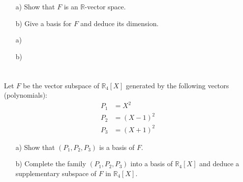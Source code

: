 \documentclass[12pt]{article}
\begin{document}
\begin{enumerate}
    \item[a)] Show that $F$ is an $\mathbb{R}$-vector space.
    \item[b)] Give a basis for $F$ and deduce its dimension.
\end{enumerate}

\begin{correctionbox}                                                                                                                                                                                                                    
 \begin{enumerate}                                            
     \item[a)] 
     \item[b)] 
 \end{enumerate}                                              
\end{correctionbox}                                                                                                                                                                                                                      
                                                                                                                                                                                                                                         
\section{}                                                                                                                                                                                                                               
Let $F$ be the vector subspace of $\mathbb{R}_4[X]$ generated by the following vectors (polynomials):
\begin{align*}
P_1 &= X^2\\
P_2 &= (X - 1)^2\\
P_3 &= (X + 1)^2
\end{align*}

\begin{enumerate}
    \item[a)] Show that $(P_1, P_2, P_3)$ is a basis of $F$.
    \item[b)] Complete the family $(P_1, P_2, P_3)$ into a basis of $\mathbb{R}_4[X]$ and deduce a supplementary subspace of $F$ in $\mathbb{R}_4[X]$.
\end{enumerate}
                                                                                                                                                                                                                                         
\end{document}
